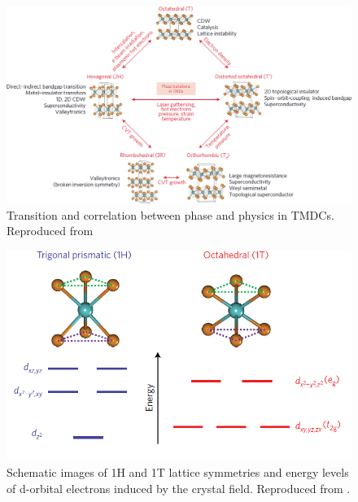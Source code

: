 \begin{figure}[!h]
	\begin{center}
		\includegraphics[scale=0.3]{1T'/TMDCPhases.png}
		\caption{Transition and correlation between phase and physics in TMDCs. Reproduced from \cite{Yang2017}}
		\label{fig:1T'TMDCPhases}
	\end{center}
\end{figure}

\begin{figure}[!h]
	\begin{center}
		\includegraphics[scale=0.5]{1T'/EnergyDiagram.png}
		\caption{Schematic images of 1H and 1T lattice symmetries and energy levels of d-orbital electrons induced by the crystal field. Reproduced from \cite{Yang2017}.}
		\label{fig:1T'EnergyDiagram}
	\end{center}
\end{figure}


